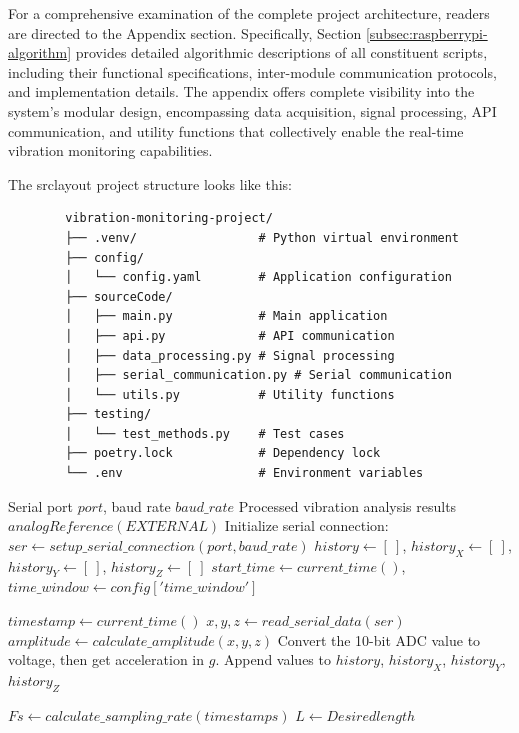 {	For a comprehensive examination of the complete project architecture, readers are directed to the Appendix section. Specifically, Section \ref{subsec:raspberrypi-algorithm} provides detailed algorithmic descriptions of all constituent scripts, including their functional specifications, inter-module communication protocols, and implementation details. The appendix offers complete visibility into the system's modular design, encompassing data acquisition, signal processing, API communication, and utility functions that collectively enable the real-time vibration monitoring capabilities.
	
	The srclayout project structure looks like this: 
	\begin{verbatim}
		vibration-monitoring-project/
		├── .venv/                 # Python virtual environment
		├── config/
		│   └── config.yaml        # Application configuration
		├── sourceCode/
		│   ├── main.py            # Main application
		│   ├── api.py             # API communication
		│   ├── data_processing.py # Signal processing
		│   ├── serial_communication.py # Serial communication
		│   └── utils.py           # Utility functions
		├── testing/
		│   └── test_methods.py    # Test cases
		├── poetry.lock            # Dependency lock
		└── .env                   # Environment variables
	\end{verbatim}
	
	\begin{algorithm}[H]
		\caption{Raspberry Pi Data Processing Pipeline}
		\label{alg:rpi-processing}
		\begin{algorithmic}[1]
			\REQUIRE Serial port $port$, baud rate $baud\_rate$
			\ENSURE Processed vibration analysis results
			\STATE $analogReference(EXTERNAL)$
			\STATE Initialize serial connection: $ser \gets setup\_serial\_connection(port, baud\_rate)$
			\STATE $history \gets [~]$, $history_X \gets [~]$, $history_Y \gets [~]$, $history_Z \gets [~]$
			\STATE $start\_time \gets current\_time()$, $time\_window \gets config['time\_window']$
			
			\STATE $timestamp \gets current\_time()$
			\STATE $x, y, z \gets read\_serial\_data(ser)$
			\STATE $amplitude \gets calculate\_amplitude(x, y, z)$
			\STATE Convert the 10-bit ADC value to voltage, then get acceleration in \(g\).
			\STATE Append values to $history$, $history_X$, $history_Y$, $history_Z$
			\ENDWHILE
			
			\STATE $Fs \gets calculate\_sampling\_rate(timestamps)$
			\STATE $L \gets Desired length$ 
			

\end{algorithmic}
\end{algorithm}}
